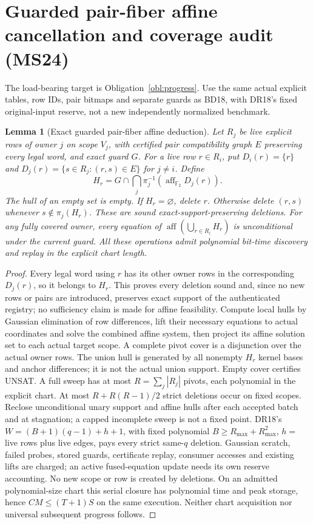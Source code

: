 \documentclass[11pt]{article}
\newtheorem{lemma}[theorem]{Lemma}
\begin{document}
\section{Guarded pair-fiber affine cancellation and coverage audit (MS24)}\label{sec:ms24}
The load-bearing target is Obligation~\ref{obl:progress}. Use the same actual explicit tables, row IDs, pair bitmaps and separate guards as BD18, with DR18's fixed original-input reserve, not a new independently normalized benchmark.
\begin{lemma}[Exact guarded pair-fiber affine deduction]\label{lem:ms24-fiber}
Let $R_j$ be live explicit rows of owner $j$ on scope $V_j$, with certified pair compatibility graph $E$ preserving every legal word, and exact guard $G$. For a live row $r\in R_i$, put $D_i(r)=\{r\}$ and $D_j(r)=\{s\in R_j:(r,s)\in E\}$ for $j\ne i$. Define
\[
 H_r=G\cap\bigcap_j\pi_j^{-1}(\operatorname{aff}_{\mathbb F_2}D_j(r)).
\]
The hull of an empty set is empty. If $H_r=\varnothing$, delete $r$. Otherwise delete $(r,s)$ whenever $s\notin\pi_j(H_r)$. These are sound exact-support-preserving deletions. For any fully covered owner, every equation of $\operatorname{aff}(\bigcup_{r\in R_i}H_r)$ is unconditional under the current guard. All these operations admit polynomial bit-time discovery and replay in the explicit chart length.
\end{lemma}
\begin{proof}
Every legal word using $r$ has its other owner rows in the corresponding $D_j(r)$, so it belongs to $H_r$. This proves every deletion sound and, since no new rows or pairs are introduced, preserves exact support of the authenticated registry; no sufficiency claim is made for affine feasibility. Compute local hulls by Gaussian elimination of row differences, lift their necessary equations to actual coordinates and solve the combined affine system, then project its affine solution set to each actual target scope. A complete pivot cover is a disjunction over the actual owner rows. The union hull is generated by all nonempty $H_r$ kernel bases and anchor differences; it is not the actual union support. Empty cover certifies UNSAT. A full sweep has at most $R=\sum_j|R_j|$ pivots, each polynomial in the explicit chart. At most $R+R(R-1)/2$ strict deletions occur on fixed scopes. Reclose unconditional unary support and affine hulls after each accepted batch and at stagnation; a capped incomplete sweep is not a fixed point. DR18's $W=(B+1)(q-1)+h+1$, with fixed polynomial $B\ge R_{\max}+R_{\max}^2$, $h=$ live rows plus live edges, pays every strict same-$q$ deletion. Gaussian scratch, failed probes, stored guards, certificate replay, consumer accesses and existing lifts are charged; an active fused-equation update needs its own reserve accounting. No new scope or row is created by deletions. On an admitted polynomial-size chart this serial closure has polynomial time and peak storage, hence $CM\le(T+1)S$ on the same execution. Neither chart acquisition nor universal subsequent progress follows.
\end{proof}
\end{document}
